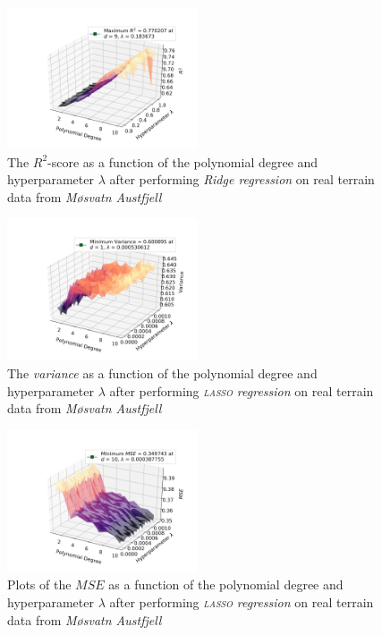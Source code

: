 \documentclass[a4paper,10pt,english]{article}
\begin{document}
\begin{multicols*}{2}
\begin{figure}[H]
	\centering 
	\includegraphics[width = 0.5\textwidth, center]{../real_output/part_D_3.png}
	\caption{The $R^2$-score as a function of the polynomial degree and hyperparameter $\lambda$ after performing \textit{Ridge regression} on real terrain data from \textit{Møsvatn Austfjell}}
	\label{fig_21}
\end{figure}

\begin{figure}[H]
	\centering 
	\includegraphics[width = 0.5\textwidth, center]{../real_output/part_E_1.png}
	\caption{The \textit{variance} as a function of the polynomial degree and hyperparameter $\lambda$ after performing \textit{\textsc{lasso} regression} on real terrain data from \textit{Møsvatn Austfjell}}
	\label{fig_22}
\end{figure}

\begin{figure}[H]
	\centering 
	\includegraphics[width = 0.5\textwidth, center]{../real_output/part_E_2.png}
	\caption{Plots of the $MSE$ as a function of the polynomial degree and hyperparameter $\lambda$ after performing \textit{\textsc{lasso} regression} on real terrain data from \textit{Møsvatn Austfjell}}
	\label{fig_23}
\end{figure}


\end{multicols*}
\end{document}

